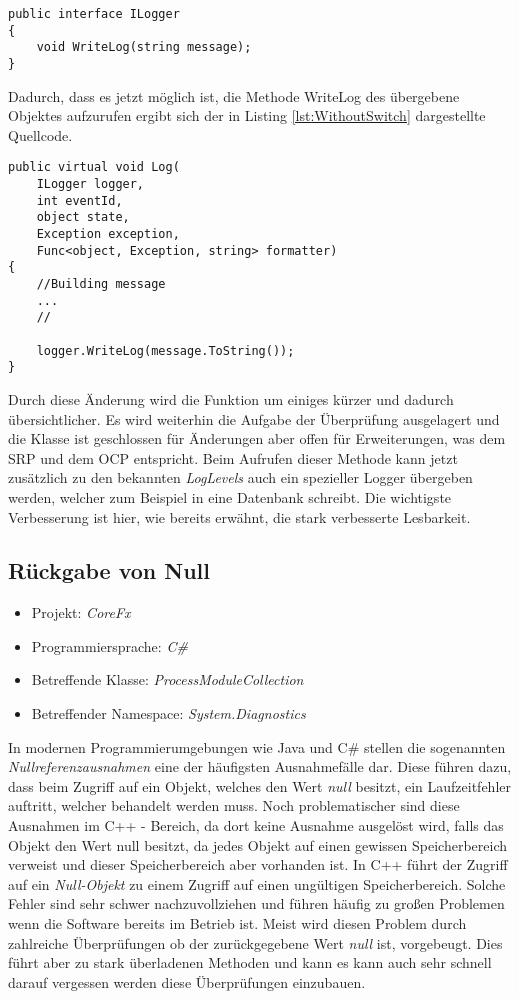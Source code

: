 \begin{lstlisting}[language={[Sharp]C}, caption=Beispiele für ein Log Interface, label=lst:LogInterface]
public interface ILogger
{
	void WriteLog(string message);
}
\end{lstlisting}

\SuperPar Dadurch, dass es jetzt möglich ist, die Methode WriteLog des übergebene Objektes aufzurufen ergibt sich der in Listing \ref{lst:WithoutSwitch} dargestellte Quellcode.

\begin{lstlisting}[language={[Sharp]C}, caption=Beispiele für Switch Statement, label=lst:WithoutSwitch]
public virtual void Log(
	ILogger logger,
	int eventId,
	object state,
	Exception exception,
	Func<object, Exception, string> formatter)
{
	//Building message
	...
	//

	logger.WriteLog(message.ToString());
}
\end{lstlisting}

\SuperPar Durch diese Änderung wird die Funktion um einiges kürzer und dadurch übersichtlicher. Es wird weiterhin die Aufgabe der Überprüfung ausgelagert und die Klasse ist geschlossen für Änderungen aber offen für Erweiterungen, was dem SRP und dem OCP entspricht. Beim Aufrufen dieser Methode kann jetzt zusätzlich zu den bekannten \textit{LogLevels} auch ein spezieller Logger übergeben werden, welcher zum Beispiel in eine Datenbank schreibt. Die wichtigste Verbesserung ist hier, wie bereits erwähnt, die stark verbesserte Lesbarkeit. 

\subsection{Rückgabe von Null}
\begin{itemize}
	\item Projekt: \textit{CoreFx}
	\item Programmiersprache: \textit{C\#}
	\item Betreffende Klasse: \textit{ProcessModuleCollection}
	\item Betreffender Namespace: \textit{System.Diagnostics}
\end{itemize}

\SuperPar In modernen Programmierumgebungen wie Java und C\# stellen die sogenannten \textit{Nullreferenzausnahmen} eine der häufigsten Ausnahmefälle dar. Diese führen dazu, dass beim Zugriff auf ein Objekt, welches den Wert \textit{null} besitzt, ein Laufzeitfehler auftritt, welcher behandelt werden muss. Noch problematischer sind diese Ausnahmen im C++ - Bereich, da dort keine Ausnahme ausgelöst wird, falls das Objekt den Wert null besitzt, da jedes Objekt auf einen gewissen Speicherbereich verweist und dieser Speicherbereich aber vorhanden ist. In C++ führt der Zugriff auf ein \textit{Null-Objekt} zu einem Zugriff auf einen ungültigen Speicherbereich. Solche Fehler sind sehr schwer nachzuvollziehen und führen häufig zu großen Problemen wenn die Software bereits im Betrieb ist. Meist wird diesen Problem durch zahlreiche Überprüfungen ob der zurückgegebene Wert \textit{null} ist, vorgebeugt. Dies führt aber zu stark überladenen Methoden und kann es kann auch sehr schnell darauf vergessen werden diese Überprüfungen einzubauen.

